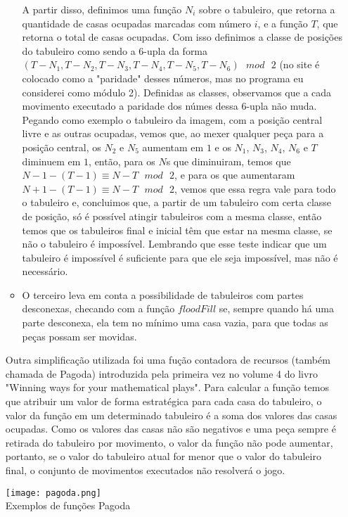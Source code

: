 \documentclass[12pt, a4paper]{article} %
\begin{document}
\begin{enumerate}
\begin{itemize}
A partir disso, definimos uma função $N_i$ sobre o tabuleiro, que retorna a quantidade de casas ocupadas marcadas com número $i$, e a função $T$, que retorna o total de casas ocupadas. Com isso definimos a classe de posições do tabuleiro como sendo a 6-upla da forma $(T-N_1,T-N_2,T-N_3,T-N_4,T-N_5,T-N_6)\text{ }mod\text{ }2$ (no site é colocado como a "paridade" desses números, mas no programa eu considerei como módulo 2). Definidas as classes, observamos que a cada movimento executado a paridade dos númes dessa 6-upla não muda. Pegando como exemplo o tabuleiro da imagem, com a posição central livre e as outras ocupadas, vemos que, ao mexer qualquer peça para a posição central, os $N_2$ e $N_5$ aumentam em $1$ e os $N_1$, $N_3$, $N_4$, $N_6$ e $T$ diminuem em $1$, então, para os $N$s que diminuiram, temos que $N-1-(T-1)\equiv N-T\text{ }mod\text{ }2$, e para os que aumentaram $N+1-(T-1)\equiv N-T\text{ }mod\text{ }2$, vemos que essa regra vale para todo o tabuleiro e, concluimos que, a partir de um tabuleiro com certa classe de posição, só é possível atingir tabuleiros com a mesma classe, então temos que os tabuleiros final e inicial têm que estar na mesma classe, se não o tabuleiro é impossível. Lembrando que esse teste indicar que um tabuleiro é impossível é suficiente para que ele seja impossível, mas não é necessário.
\item O terceiro leva em conta a possibilidade de tabuleiros com partes desconexas, checando com a função $floodFill$ se, sempre quando há uma parte desconexa, ela tem no mínimo uma casa vazia, para que todas as peças possam ser movidas.\\[-0.5cm]
\end {itemize}
Outra simplificação utilizada foi uma fução contadora de recursos (também chamada de Pagoda) introduzida pela primeira vez no volume 4 do livro "Winning ways for your mathematical plays". Para calcular a função temos que atribuir um valor de forma estratégica para cada casa do tabuleiro, o valor da função em um determinado tabuleiro é a soma dos valores das casas ocupadas. Como os valores das casas não são negativos e uma peça sempre é retirada do tabuleiro por movimento, o valor da função não pode aumentar, portanto, se o valor do tabuleiro atual for menor que o valor do tabuleiro final, o conjunto de movimentos executados não resolverá o jogo.\\
\small
\begin{center}
\texttt{[image: pagoda.png]}\\
Exemplos de funções Pagoda\cite{wwmp}\\

\end{center}
\end{enumerate}
\end{document}

